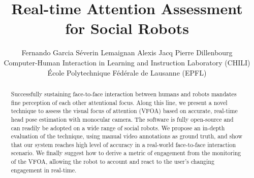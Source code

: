 \documentclass{sig-alternate}
\begin{document}
%

\title{Real-time Attention Assessment for Social Robots}
\author{Fernando Garcia \qquad Séverin Lemaignan \qquad Alexis Jacq \qquad Pierre Dillenbourg\\Computer-Human Interaction in Learning and Instruction Laboratory (CHILI)\\École Polytechnique Fédérale de Lausanne (EPFL)}


\maketitle
\begin{abstract}

Successfully sustaining face-to-face interaction between humans and robots
mandates fine perception of each other attentional focus. Along this line, we
present a novel technique to assess the visual focus of attention (VFOA) based
on accurate, real-time head pose estimation with monocular camera. The software
is fully open-source and can readily be adopted on a wide range of social
robots. We propose an in-depth evaluation of the technique, using manual video
annotations as ground truth, and show that our system reaches high level of
accuracy in a real-world face-to-face interaction scenario. We finally suggest how
to derive a metric of engagement from the monitoring of the VFOA, allowing the
robot to account and react to the user's changing engagement in real-time.

\end{abstract}



\end{document}
